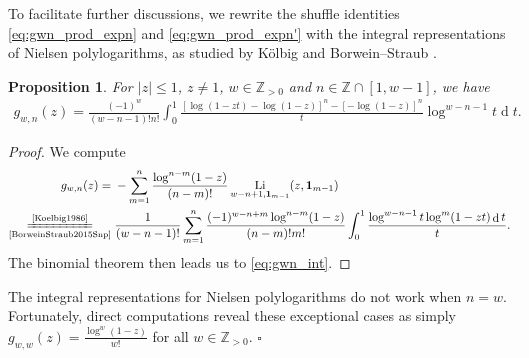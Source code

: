 \documentclass[final,notitlepage,12pt,reqno]{amsart}
\DeclareMathOperator{\Li}{Li}
\DeclareMathOperator{\D}{d}
\def\eor{\hfill$ \square$}
\theoremstyle{plain}
\newtheorem{proposition}[theorem]{Proposition}
\newenvironment{remark}[1][Remark]{\begin{trivlist}
\item[\hskip \labelsep {\bfseries #1}]}{\end{trivlist}}
\theoremstyle{definition}
\numberwithin{equation}{section}
\begin{document}
To facilitate further discussions, we rewrite the shuffle identities \eqref{eq:gwn_prod_expn} and \eqref{eq:gwn_prod_expn'}
with the  integral representations of Nielsen polylogarithms, as studied by K\"olbig \cite[(1.3)]{Koelbig1986} and Borwein--Straub \cite[(5)]{BorweinStraub2015Snp}. \begin{proposition}
For $ |z|\leq1$, $ z\neq1$, $ w\in\mathbb Z_{>0}$ and $ n\in\mathbb Z\cap[1,w-1]$, we have\begin{align}
g_{w,n}(z)=\frac{(-1)^w}{(w-n-1)!n!}\int_0^1 \frac{[\log^{}(1-zt)-\log(1-z)]^{n}-[-\log(1-z)]^n}{t}\log^{w-n-1}t\D t.\label{eq:gwn_int}
\end{align} \end{proposition}\begin{proof}We compute \begin{align}
\begin{split}g_{w,n}(z)={}&-\sum_{m=1}^n\frac{\log^{n-m}(1-z)}{(n-m)!}\Li_{w-n+1,\boldsymbol1_{m-1}}(z,\boldsymbol1_{m-1})\\\underset{\text{\cite[(5)]{BorweinStraub2015Snp}}}{\xlongequal{\text{\cite[(1.3)]{Koelbig1986}}}}{}&\frac{1}{(w-n-1)!}\sum_{m=1}^n\frac{(-1)^{w-n+m}\log^{n-m}(1-z)}{(n-m)!m!}\int_0^1\frac{\log^{w-n-1}t\log^{m}(1-zt)\D t}{t}.
\end{split}
\end{align}  The binomial theorem then leads us to  \eqref{eq:gwn_int}.
\end{proof}
\begin{remark}The integral representations for Nielsen polylogarithms do not work when $n=w$. Fortunately,  direct computations reveal these exceptional cases as simply $ g_{w,w}(z)=\frac{\log^w(1-z)}{w!}$ for all $ w\in\mathbb Z_{>0}$.
\eor\end{remark}
\end{document}
